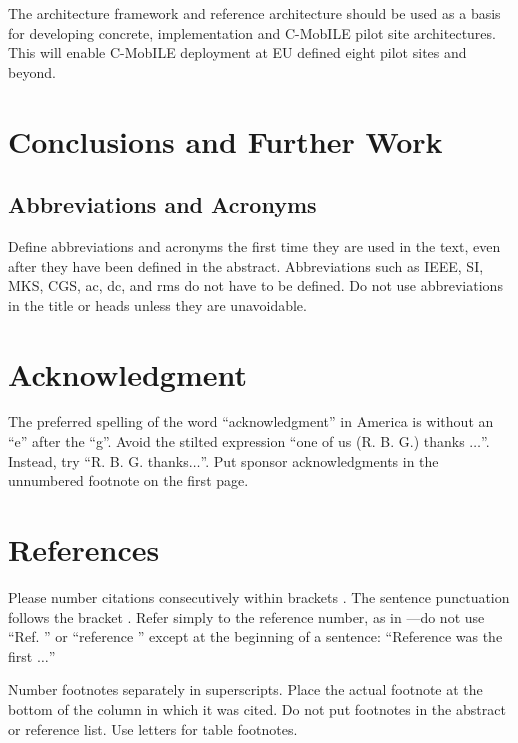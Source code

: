 \documentclass[conference]{IEEEtran}
\begin{document}
The architecture framework and reference architecture should be used as a basis for developing concrete, implementation and C-MobILE pilot site architectures. This will enable C-MobILE deployment at EU defined eight pilot sites and beyond. 


\section{Conclusions and Further Work}



\subsection{Abbreviations and Acronyms}\label{AA}
Define abbreviations and acronyms the first time they are used in the text, 
even after they have been defined in the abstract. Abbreviations such as 
IEEE, SI, MKS, CGS, ac, dc, and rms do not have to be defined. Do not use 
abbreviations in the title or heads unless they are unavoidable.









\section*{Acknowledgment}

The preferred spelling of the word ``acknowledgment'' in America is without 
an ``e'' after the ``g''. Avoid the stilted expression ``one of us (R. B. 
G.) thanks $\ldots$''. Instead, try ``R. B. G. thanks$\ldots$''. Put sponsor 
acknowledgments in the unnumbered footnote on the first page.

\section*{References}

Please number citations consecutively within brackets \cite{b1}. The 
sentence punctuation follows the bracket \cite{b2}. Refer simply to the reference 
number, as in \cite{b3}---do not use ``Ref. \cite{b3}'' or ``reference \cite{b3}'' except at 
the beginning of a sentence: ``Reference \cite{b3} was the first $\ldots$''

Number footnotes separately in superscripts. Place the actual footnote at 
the bottom of the column in which it was cited. Do not put footnotes in the 
abstract or reference list. Use letters for table footnotes.
\end{document}
